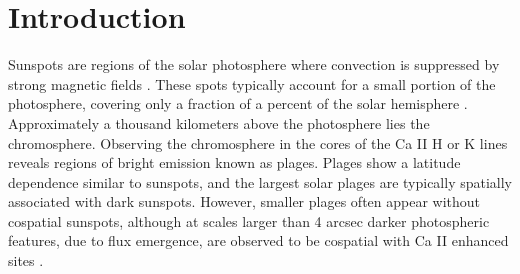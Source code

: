 %
%

\section{Introduction}

Sunspots are regions of the solar photosphere where convection is suppressed by strong magnetic fields \citep{Spruit1977, Solanki2003}. These spots typically account for a small portion of the  photosphere, covering only a fraction of a percent of the solar hemisphere \citep{Howard1984}.  Approximately a thousand kilometers above the photosphere lies the chromosphere. Observing the chromosphere in the cores of the Ca II H or K lines reveals regions of bright emission known as plages. Plages show a latitude dependence similar to sunspots, and the largest solar plages are typically spatially associated with dark sunspots. However, smaller plages often appear without cospatial sunspots, although at scales larger than 4 arcsec darker photospheric features, due to flux emergence, are observed to be cospatial with Ca II enhanced sites \citep{Hall2008, Guglielmino2010, Mandal2017}.

